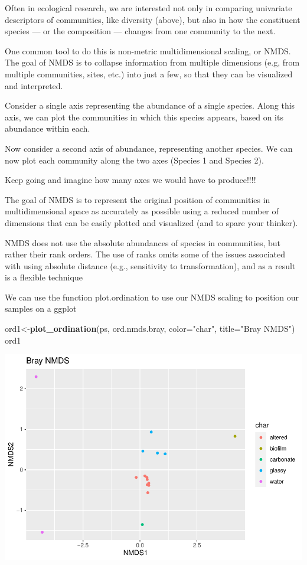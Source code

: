 \documentclass[
]{book}
\newenvironment{Shaded}{\begin{snugshade}}{\end{snugshade}}
\newcommand{\AttributeTok}[1]{\textcolor[rgb]{0.13,0.29,0.53}{#1}}
\newcommand{\FunctionTok}[1]{\textcolor[rgb]{0.13,0.29,0.53}{\textbf{#1}}}
\newcommand{\NormalTok}[1]{#1}
\newcommand{\OtherTok}[1]{\textcolor[rgb]{0.56,0.35,0.01}{#1}}
\newcommand{\StringTok}[1]{\textcolor[rgb]{0.31,0.60,0.02}{#1}}
\begin{document}
Often in ecological research, we are interested not only in comparing univariate descriptors of communities, like diversity (above), but also in how the constituent species --- or the composition --- changes from one community to the next.

One common tool to do this is non-metric multidimensional scaling, or NMDS. The goal of NMDS is to collapse information from multiple dimensions (e.g, from multiple communities, sites, etc.) into just a few, so that they can be visualized and interpreted.

Consider a single axis representing the abundance of a single species. Along this axis, we can plot the communities in which this species appears, based on its abundance within each.

Now consider a second axis of abundance, representing another species. We can now plot each community along the two axes (Species 1 and Species 2).

Keep going and imagine how many axes we would have to produce!!!!

The goal of NMDS is to represent the original position of communities in multidimensional space as accurately as possible using a reduced number of dimensions that can be easily plotted and visualized (and to spare your thinker).

NMDS does not use the absolute abundances of species in communities, but rather their rank orders. The use of ranks omits some of the issues associated with using absolute distance (e.g., sensitivity to transformation), and as a result is a flexible technique

We can use the function plot.ordination to use our NMDS scaling to position our samples on a ggplot

\begin{Shaded}
\begin{Highlighting}[]
\NormalTok{ord1}\OtherTok{\textless{}{-}}\FunctionTok{plot\_ordination}\NormalTok{(ps, ord.nmds.bray, }\AttributeTok{color=}\StringTok{"char"}\NormalTok{, }\AttributeTok{title=}\StringTok{"Bray NMDS"}\NormalTok{)}
\NormalTok{ord1}
\end{Highlighting}
\end{Shaded}

\includegraphics{bookdown-demo_files/figure-latex/unnamed-chunk-76-1.pdf}
\end{document}
